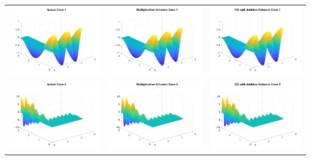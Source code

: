 \documentclass[11pt]{article}
\theoremstyle{definition}
\theoremstyle{remark}
\theoremstyle{plain}
\begin{document}
\begin{center}
  \begin{tabular}{ccc}
    \includegraphics[width=0.3\linewidth]{../Figures/final_3_actual_1.png}&\includegraphics[width=0.3\linewidth]{../Figures/final_3_mult_1.png}&\includegraphics[width=0.3\linewidth]{../Figures/final_3_pcg_1.png}\\
    \includegraphics[width=0.3\linewidth]{../Figures/final_3_actual_2.png}&\includegraphics[width=0.3\linewidth]{../Figures/final_3_mult_2.png}&\includegraphics[width=0.3\linewidth]{../Figures/final_3_pcg_2.png}\\

\end{tabular}
\end{center}
\end{document}
